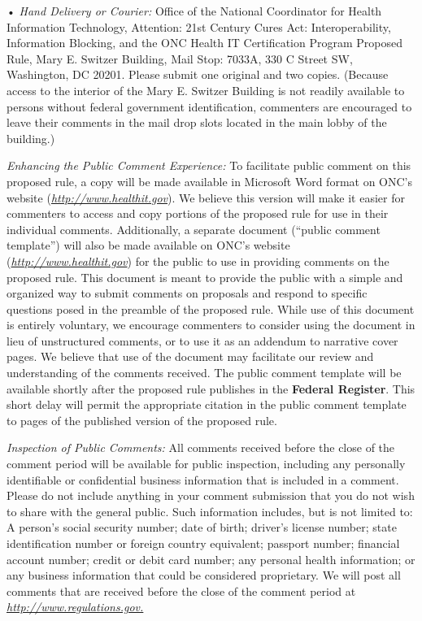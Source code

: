 \documentclass[twoside,11pt]{article}
\begin{document}
            • \emph{Hand Delivery or Courier:} Office of the National Coordinator for Health Information Technology, Attention: 21st Century Cures Act: Interoperability, Information Blocking, and the ONC Health IT Certification Program Proposed Rule, Mary E. Switzer Building, Mail Stop: 7033A, 330 C Street SW, Washington, DC 20201. Please submit one original and two copies. (Because access to the interior of the Mary E. Switzer Building is not readily available to persons without federal government identification, commenters are encouraged to leave their comments in the mail drop slots located in the main lobby of the building.)


            
              \emph{Enhancing the Public Comment Experience:} To facilitate public comment on this proposed rule, a copy will be made available in Microsoft Word format on ONC's website (\emph{\url{http://www.healthit.gov}}). We believe this version will make it easier for commenters to access and copy portions of the proposed rule for use in their individual comments. Additionally, a separate document (“public comment template”) will also be made available on ONC's website (\emph{\url{http://www.healthit.gov}}) for the public to use in providing comments on the proposed rule. This document is meant to provide the public with a simple and organized way to submit comments on proposals and respond to specific questions posed in the preamble of the proposed rule. While use of this document is entirely voluntary, we encourage commenters to consider using the document in lieu of unstructured comments, or to use it as an addendum to narrative cover pages. We believe that use of the document may facilitate our review and understanding of the comments received. The public comment template will be available shortly after the proposed rule publishes in the \textbf{Federal Register}. This short delay will permit the appropriate citation in the public comment template to pages of the published version of the proposed rule.


            
              \emph{Inspection of Public Comments:} All comments received before the close of the comment period will be available for public inspection, including any personally identifiable or confidential business information that is included in a comment. Please do not include anything in your comment submission that you do not wish to share with the general public. Such information includes, but is not limited to: A person's social security number; date of birth; driver's license number; state identification number or foreign country equivalent; passport number; financial account number; credit or debit card number; any personal health information; or any business information that could be considered proprietary. We will post all comments that are received before the close of the comment period at \emph{\url{http://www.regulations.gov.}}
            
\end{document}
